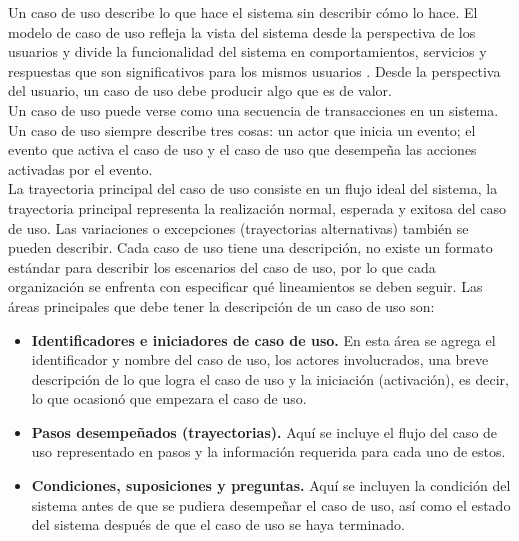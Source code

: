 Un caso de uso describe lo que hace el sistema sin describir cómo lo hace. El modelo de caso de uso refleja la 
vista del sistema desde la perspectiva de los usuarios y divide la funcionalidad del sistema en comportamientos, servicios y respuestas que son 
significativos para los mismos usuarios \cite{kendall2005analisis}. Desde la perspectiva del usuario, un caso de uso debe producir algo que es de valor.\\

Un caso de uso puede verse como una secuencia de transacciones en un sistema. Un caso de uso siempre describe tres cosas: un actor que inicia un evento; 
el evento que activa el caso de uso y el caso de uso que desempeña las acciones activadas
por el evento.\\

La trayectoria principal del caso de uso consiste en un flujo ideal del sistema, la trayectoria principal representa la realización normal, esperada y exitosa del caso de uso. Las variaciones o excepciones (trayectorias alternativas) también 
se pueden describir. Cada caso de uso tiene una descripción, no existe un formato estándar para describir los escenarios del caso de uso, por lo que cada organización se enfrenta con especificar qué lineamientos se deben seguir. Las áreas principales 
que debe tener la descripción de un caso de uso son:
\begin{itemize}
 \item {\bf Identificadores e iniciadores de caso de uso.} En esta área se agrega el identificador y nombre del caso de uso, los actores involucrados, una breve descripción de lo que logra el caso de uso y la iniciación (activación), es decir, lo que ocasionó que empezara el caso de uso.
 \item {\bf Pasos desempeñados (trayectorias).} Aquí se incluye el flujo del caso de uso representado en pasos y la información requerida para cada uno de estos.
 \item {\bf Condiciones, suposiciones y preguntas.} Aquí se incluyen la condición del sistema antes de que se pudiera desempeñar el caso de uso, así como el estado del sistema después de que el caso de uso se haya terminado.
\end{itemize}

